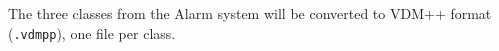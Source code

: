 The three classes from the Alarm system will be converted to VDM++ format
(\texttt{.vdmpp}), one file per class.



%


%

